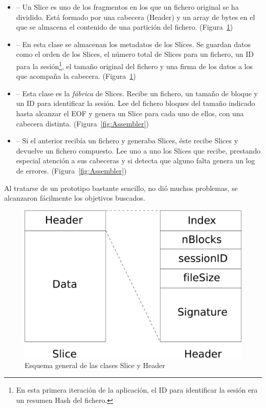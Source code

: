 \begin{itemize}
  \item {} -- Un Slice es uno de los fragmentos en los que un
  fichero original se ha dividido. Está formado por una cabecera (Header) y un
  array de bytes en el que se almacena el contenido de una partición del fichero.
  (Figura~\ref{fig:Slice_Header})

  \item {} -- En esta clase se almacenan los metadatos de los
  Slices. Se guardan datos como el orden de los Slices, el número total de Slices
  para un fichero, un ID para la sesión\footnote{En esta primera iteración de la
  aplicación, el ID para identificar la sesión era un resumen Hash del fichero.},
  el tamaño original del fichero y una firma de los datos a los que acompaña la cabecera.
  (Figura~\ref{fig:Slice_Header})

  \item {} -- Esta clase es la \emph{fábrica} de Slices. Recibe
  un fichero, un tamaño de bloque y un ID para identificar la sesión. Lee del
  fichero bloques del tamaño indicado hasta alcanzar el EOF y genera un Slice
  para cada uno de ellos, con una cabecera distinta. (Figura~\ref{fig:Assembler})

  \item {} -- Si el anterior recibía un fichero y generaba Slices,
  éste recibe Slices y devuelve un fichero compuesto. Lee uno a uno los Slices
  que recibe, prestando especial atención a sus cabeceras y si detecta que
  alguno falta genera un log de errores. (Figura~\ref{fig:Assembler})
\end{itemize}

Al tratarse de un prototipo bastante sencillo, no dió muchos problemas, se
alcanzaron fácilmente los objetivos buscados.

\begin{figure}[ht]
  \centering
  \includegraphics[scale=0.4]{Figures/Slice_Header}
  \decoRule
  \caption[Slice - Header]{Esquema general de las clases Slice y Header}
  \label{fig:Slice_Header}
\end{figure}

